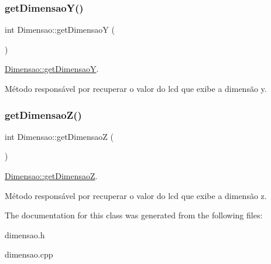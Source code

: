 \subsubsection{\texorpdfstring{getDimensaoY()}{getDimensaoY()}}
{\footnotesize\ttfamily int Dimensao\+::get\+DimensaoY (\begin{DoxyParamCaption}{ }\end{DoxyParamCaption})}



\mbox{\hyperlink{classDimensao_a5141fbeb3e622165a1b0a521c5974082}{Dimensao\+::get\+DimensaoY}}. 

Método responsável por recuperar o valor do lcd que exibe a dimensão y. \mbox{\label{classDimensao_a6a548c7d1634f8b593241c68c74b83c7}} 
\subsubsection{\texorpdfstring{getDimensaoZ()}{getDimensaoZ()}}
{\footnotesize\ttfamily int Dimensao\+::get\+DimensaoZ (\begin{DoxyParamCaption}{ }\end{DoxyParamCaption})}



\mbox{\hyperlink{classDimensao_a6a548c7d1634f8b593241c68c74b83c7}{Dimensao\+::get\+DimensaoZ}}. 

Método responsável por recuperar o valor do lcd que exibe a dimensão z. 

The documentation for this class was generated from the following files\+:\begin{DoxyCompactItemize}
\item 
dimensao.\+h\item 
dimensao.\+cpp\end{DoxyCompactItemize}

